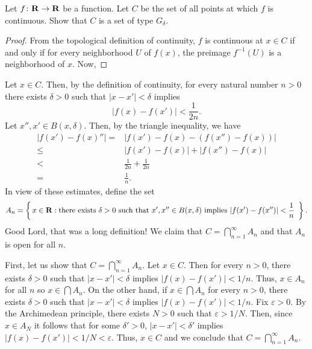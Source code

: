 \begin{problem}
Let $f\colon\mathbf{R}\to\mathbf{R}$ be a function. Let $C$ be the set of all points
at which $f$ is continuous. Show that $C$ is a set of type $G_\delta$.
\end{problem}
\begin{proof}
From the topological definition of continuity, $f$ is continuous at $x\in
C$ if and only if for every neighborhood $U$ of $f(x)$, the preimage
$f^{-1}(U)$ is a neighborhood of $x$. Now,
\end{proof}
Let $x\in C$. Then, by the definition of continuity, for every natural
number $n>0$ there exists $\delta>0$ such that $|x-x'|<\delta$ implies
\begin{equation}
\label{eq:continuity-2n}
\left|f(x)-f(x')\right|<\frac{1}{2n}.
\end{equation}
Let $x'',x'\in B(x,\delta)$. Then, by the triangle inequality, we have
\begin{equation}
\label{eq:n-estimates}
\begin{aligned}
|f(x')-f(x)''|={}&\left|f(x')-f(x)-(f(x'')-f(x))\right|\\
              \leq{}&\left|f(x')-f(x)\right|+\left|f(x'')-f(x)\right|\\
              <{}&\frac{1}{2n}+\frac{1}{2n}\\
              ={}&\frac{1}{n}.
\end{aligned}
\end{equation}
In view of these estimates, define the set
\begin{equation}
\label{eq:a-n}
A_n=
\left\{\,
x\in\mathbf{R} :\text{there exists $\delta>0$ such that $x',x''\in B(x,\delta)$ implies $\left|f(x')-f(x'')\right|<\frac{1}{n}$ }
\,\right\}.
\end{equation}
Good Lord, that was a long definition! We claim that
$C=\bigcap_{n=1}^\infty A_n$ and that $A_n$ is open for all $n$.

First, let us show that $C=\bigcap_{n=1}^\infty A_n$. Let $x\in C$. Then for
every $n>0$, there exists $\delta>0$ such that $|x-x'|<\delta$ implies
$|f(x)-f(x')|<1/n$. Thus, $x\in A_n$ for all $n$ so $x\in\bigcap A_n$. On
the other hand, if $x\in\bigcap A_n$ for every $n>0$, there exists
$\delta>0$ such that $|x-x'|<\delta$ implies $|f(x)-f(x')|<1/n$. Fix
$\varepsilon>0$. By the Archimedean principle, there exists $N>0$ such that
$\varepsilon>1/N$. Then, since $x\in A_N$ it follows that for some
$\delta'>0$, $|x-x'|<\delta'$ implies
$\left|f(x)-f(x')\right|<1/N<\varepsilon$. Thus, $x\in C$ and we conclude
that $C=\bigcap_{n=1}^\infty A_n$.


